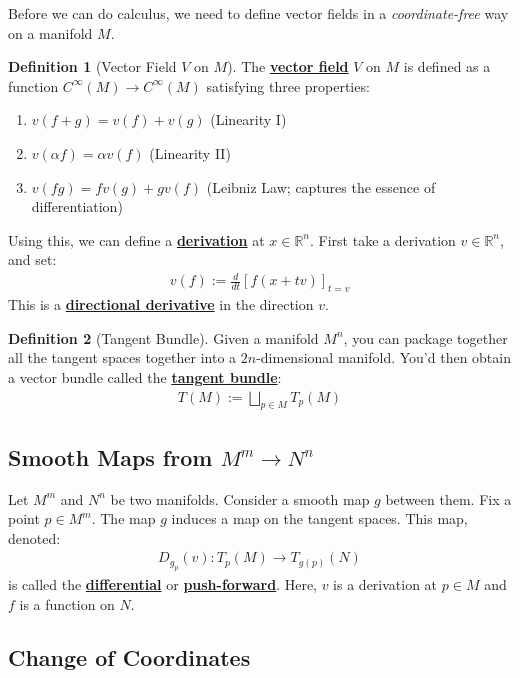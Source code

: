 \documentclass[11pt]{scrartcl}
\newcommand{\R}[0]{\mathbb{R}}
\theoremstyle{definition}
\newtheorem{definition}{Definition}
\theoremstyle{remark}
\newcommand{\dfn}[1]{\textbf{\underline{#1}}}
\begin{document}
{Before we can do calculus, we need to define vector fields in a \emph{coordinate-free} way on a manifold $M$. 

\begin{definition}[Vector Field $V$ on $M$]
	The \dfn{vector field} $V$ on $M$ is defined as a function $C^\infty(M) \rightarrow C^\infty(M)$ satisfying three properties: 
	\begin{enumerate}[noitemsep]
		\item $v(f+g) = v(f) + v(g) $ (Linearity I) 
		\item $v (\alpha f) = \alpha v(f) $ (Linearity II) 
		\item $v(fg) = fv(g) + gv(f)$ (Leibniz Law; captures the essence of differentiation)
	\end{enumerate}
\end{definition}

Using this, we can define a \dfn{derivation} at $x \in \R^n$. First take a derivation $v \in \R^n$, and set: 
\begin{align}
	v(f) := \frac{d}{dt} \left[ f(x+tv) \right]_{t =v} 	
\end{align}
This is a \dfn{directional derivative} in the direction $v$. 

\begin{definition}[Tangent Bundle]
	Given a manifold $M^n$, you can package together all the tangent spaces together into a $2n$-dimensional manifold. You'd then obtain a vector bundle called the \dfn{tangent bundle}: 
	\begin{align*}
		T(M) := \bigsqcup_{p \in M} T_p(M) 
	\end{align*}
\end{definition}

\subsection{Smooth Maps from $M^m \rightarrow N^n$}
Let $M^m$ and $N^n$ be two manifolds. Consider a smooth map $g$ between them. Fix a point $p \in M^m$. The map $g$ induces a map on the tangent spaces. This map, denoted: 
\begin{align*}
	 D_{g_p}(v): T_p(M) \rightarrow T_{g(p)}(N)
\end{align*}
	is called the \dfn{differential} or \dfn{push-forward}. Here, $v$ is a derivation at $p \in M$ and $f$ is a function on $N$. 


\subsection{Change of Coordinates}

}
\end{document}
